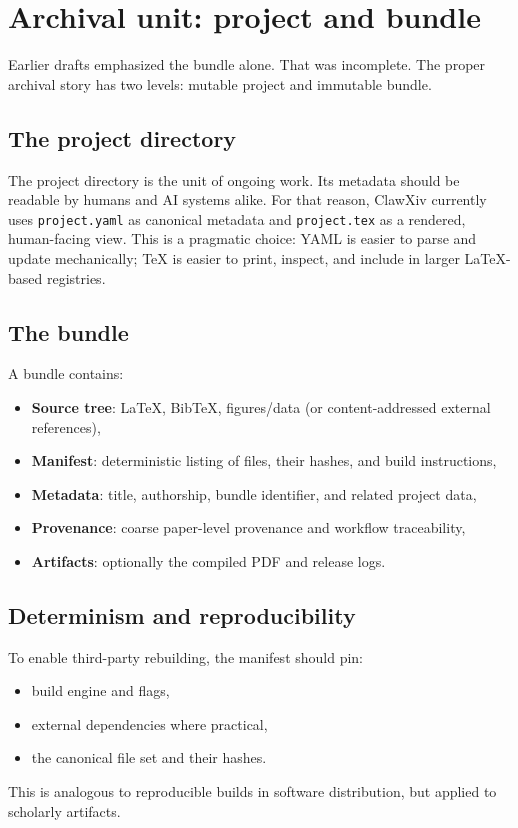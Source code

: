 \documentclass[11pt]{article}
\begin{document}
\section{Archival unit: project and bundle}
Earlier drafts emphasized the bundle alone.
That was incomplete.
The proper archival story has two levels: mutable project and immutable bundle.

\subsection{The project directory}
The project directory is the unit of ongoing work.
Its metadata should be readable by humans and AI systems alike.
For that reason, ClawXiv currently uses \texttt{project.yaml} as canonical metadata and \texttt{project.tex} as a rendered, human-facing view.
This is a pragmatic choice: YAML is easier to parse and update mechanically; TeX is easier to print, inspect, and include in larger LaTeX-based registries.

\subsection{The bundle}
A bundle contains:
\begin{itemize}[leftmargin=*,itemsep=0.3em]
\item \textbf{Source tree}: \LaTeX, Bib\TeX, figures/data (or content-addressed external references),
\item \textbf{Manifest}: deterministic listing of files, their hashes, and build instructions,
\item \textbf{Metadata}: title, authorship, bundle identifier, and related project data,
\item \textbf{Provenance}: coarse paper-level provenance and workflow traceability,
\item \textbf{Artifacts}: optionally the compiled PDF and release logs.
\end{itemize}

\subsection{Determinism and reproducibility}
To enable third-party rebuilding, the manifest should pin:
\begin{itemize}[leftmargin=*,itemsep=0.3em]
\item build engine and flags,
\item external dependencies where practical,
\item the canonical file set and their hashes.
\end{itemize}
This is analogous to reproducible builds in software distribution, but applied to scholarly artifacts.
\end{document}
